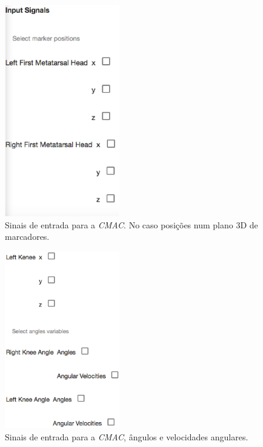 \begin{figure}[ht]
	\centering
	\includegraphics[width=5cm]{figuras/tela29.eps}
	\caption{Sinais de entrada para a \emph{CMAC}. No caso posições num plano 3D de marcadores.}
\label{tela29}
\end{figure}

\begin{figure}[ht]
	\centering
	\includegraphics[width=5cm]{figuras/tela30.eps}
	\caption{Sinais de entrada para a \emph{CMAC}, ângulos e velocidades angulares.}
\label{tela30}
\end{figure}

